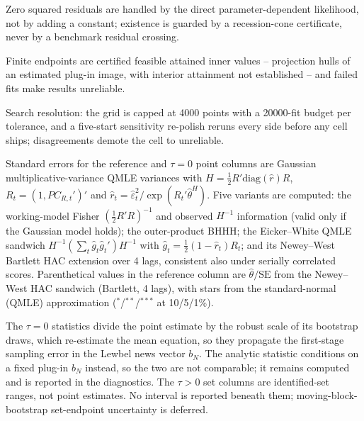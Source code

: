 \begin{table}[!htbp]
\begin{threeparttable}
\begin{tablenotes}[flushleft]
\item Zero squared residuals are handled by the direct parameter-dependent likelihood, not by adding a constant; existence is guarded by a recession-cone certificate, never by a benchmark residual crossing.
\item Finite endpoints are certified feasible attained inner values -- projection hulls of an estimated plug-in image, with interior attainment not established -- and failed fits make results unreliable.
\item Search resolution: the grid is capped at 4000 points with a 20000-fit budget per tolerance, and a five-start sensitivity re-polish reruns every side before any cell ships; disagreements demote the cell to unreliable.
\item Standard errors for the reference and $\tau{=}0$ point columns are Gaussian multiplicative-variance QMLE variances with $H = \frac{1}{2}R'\mathrm{diag}(\hat r)R$, $R_t = (1, PC_{R,t}')'$ and $\hat r_t = \hat\varepsilon_t^2 / \exp(R_t'\hat\theta^{H})$. Five variants are computed: the working-model Fisher $(\frac{1}{2}R'R)^{-1}$ and observed $H^{-1}$ information (valid only if the Gaussian model holds); the outer-product BHHH; the Eicker--White QMLE sandwich $H^{-1} (\sum_t \hat g_t \hat g_t')H^{-1}$ with $\hat g_t = \frac{1}{2}(1 - \hat r_t)R_t$; and its Newey--West Bartlett HAC extension over 4 lags, consistent also under serially correlated scores. Parenthetical values in the reference column are $\hat\theta/\mathrm{SE}$ from the Newey--West HAC sandwich (Bartlett, 4 lags), with stars from the standard-normal (QMLE) approximation ($^{*}$/$^{**}$/$^{***}$ at 10/5/1\%).
\item The $\tau{=}0$ statistics divide the point estimate by the robust scale of its bootstrap draws, which re-estimate the mean equation, so they propagate the first-stage sampling error in the Lewbel news vector $b_N$. The analytic statistic conditions on a fixed plug-in $b_N$ instead, so the two are not comparable; it remains computed and is reported in the diagnostics. The $\tau{>}0$ set columns are identified-set ranges, not point estimates. No interval is reported beneath them; moving-block-bootstrap set-endpoint uncertainty is deferred.
\end{tablenotes}
\end{threeparttable}
\end{table}

